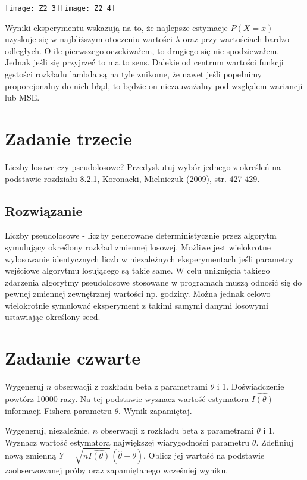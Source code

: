 \documentclass[a4paper]{article}
\begin{document}
\begin{center}
\texttt{[image: Z2\_3]}\texttt{[image: Z2\_4]} 
\end{center}

Wyniki eksperymentu wskazują na to, że najlepsze estymacje $P(X=x)$ uzyskuje się w najbliższym otoczeniu wartości $\lambda$ oraz przy wartościach bardzo odległych. O ile pierwszego oczekiwałem, to drugiego się nie spodziewałem. Jednak jeśli się przyjrzeć to ma to sens. Dalekie od centrum wartości funkcji gęstości rozkładu lambda są na tyle znikome, że nawet jeśli popełnimy proporcjonalny do nich błąd, to będzie on niezauważalny pod względem wariancji lub MSE.

\section{Zadanie trzecie}
Liczby losowe czy pseudolosowe? Przedyskutuj wybór jednego z określeń na podstawie rozdziału 8.2.1, Koronacki, Mielniczuk (2009), str. 427-429.

\subsection{Rozwiązanie}
Liczby pseudolosowe - liczby generowane deterministycznie przez algorytm symulujący określony rozkład zmiennej losowej. Możliwe jest wielokrotne wylosowanie identycznych liczb w niezależnych eksperymentach jeśli parametry wejściowe algorytmu losującego są takie same. W celu uniknięcia takiego zdarzenia algorytmy pseudolosowe stosowane w programach muszą odnosić się do pewnej zmiennej zewnętrznej wartości np. godziny. Można jednak celowo wielokrotnie symulować eksperyment z takimi samymi danymi losowymi ustawiając określony seed.

\section{Zadanie czwarte}
Wygeneruj $n$ obserwacji z rozkładu beta z parametrami $\theta$ i 1. Doświadczenie powtórz 10000 razy. Na tej podstawie wyznacz wartość estymatora $\widehat{I(\theta)}$ informacji Fishera parametru $\theta$. Wynik zapamiętaj.

Wygeneruj, niezależnie, $n$ obserwacji z rozkładu beta z parametrami $\theta$ i 1. Wyznacz wartość estymatora największej wiarygodności parametru $\theta$. Zdefiniuj nową zmienną $Y = \sqrt{n\widehat{I(\theta)}}(\hat{\theta}-\theta)$. Oblicz jej wartość na podstawie zaobserwowanej próby oraz zapamiętanego wcześniej wyniku.
\end{document}
